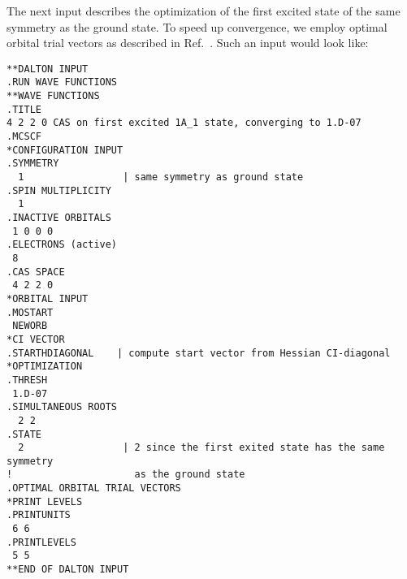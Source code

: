 \begin{center}
\end{center}

The next input describes the optimization of the first excited
state
of the same symmetry as the ground state. To speed up convergence, we
employ optimal orbital trial
vectors as described in
Ref.~\cite{hjajpjhajcp87}. Such an input would look like:

\begin{verbatim}
**DALTON INPUT
.RUN WAVE FUNCTIONS
**WAVE FUNCTIONS
.TITLE
4 2 2 0 CAS on first excited 1A_1 state, converging to 1.D-07
.MCSCF
*CONFIGURATION INPUT
.SYMMETRY
  1                 | same symmetry as ground state
.SPIN MULTIPLICITY
  1
.INACTIVE ORBITALS
 1 0 0 0
.ELECTRONS (active)
 8
.CAS SPACE
 4 2 2 0
*ORBITAL INPUT
.MOSTART
 NEWORB
*CI VECTOR
.STARTHDIAGONAL    | compute start vector from Hessian CI-diagonal
*OPTIMIZATION
.THRESH
 1.D-07
.SIMULTANEOUS ROOTS
  2 2
.STATE
  2                 | 2 since the first exited state has the same symmetry
!                     as the ground state
.OPTIMAL ORBITAL TRIAL VECTORS
*PRINT LEVELS
.PRINTUNITS
 6 6
.PRINTLEVELS
 5 5
**END OF DALTON INPUT
\end{verbatim}
\label{sirius_ex5}

\begin{center}
\end{center}

